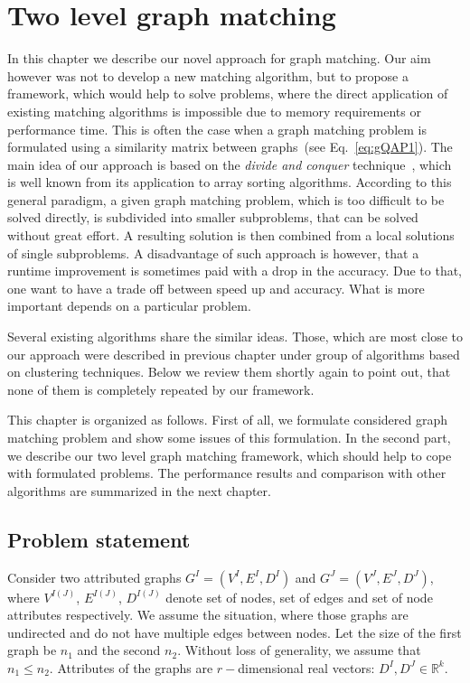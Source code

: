 \chapter{Two level graph matching} \label{chapter:2levelGM}
In this chapter we describe our novel approach for graph matching. Our aim however was not to develop a new matching algorithm, but to propose a framework, which would help to solve problems, where the direct application of existing matching algorithms is impossible due to memory requirements or performance time. This is often the case when a graph matching problem is formulated using a similarity matrix between graphs~(see Eq.~\eqref{eq:gQAP1}). The main idea of our approach is based on the  \emph{divide and conquer} technique~\cite{Cormen}, which is well known from its application to array sorting algorithms. According to this general paradigm, a given graph matching problem, which is too difficult to be solved directly, is subdivided into smaller subproblems, that can be solved without great effort. A resulting solution is then combined from a local solutions of single subproblems. A disadvantage of such approach is however, that a runtime improvement is sometimes paid with a drop in the accuracy.
Due to that, one want to have a trade off between speed up and accuracy. What is more important depends on a particular problem.

Several existing algorithms share the similar ideas. Those, which are most close to our approach were described in previous chapter under group of algorithms based on clustering techniques. Below we review them shortly again to point out, that none of them is completely repeated by our framework.

This chapter is organized as follows. First of all, we formulate considered graph matching problem and show some issues of this formulation. In the second part, we describe our two level graph matching framework, which should help to cope with formulated problems. The performance results and comparison with other algorithms are summarized in the next chapter. 
\section{Problem statement} \label{sec:prob_stat}
Consider two attributed graphs $G^I = (V^I, E^I, D^I)$ and $G^J = (V^J, E^J, D^J)$, where $V^{I(J)}$, $E^{I(J)}$, $D^{I(J)}$ denote set of nodes, set of edges and set of node attributes respectively. We assume the situation, where those graphs are undirected and do not have multiple edges between nodes. Let the size of the first graph be $n_1$ and the second $n_2$. Without loss of generality, we assume that $n_1\le n_2$. Attributes of the graphs are $r-$dimensional real vectors: $D^I,D^J\in\mathbb{R}^k$.

